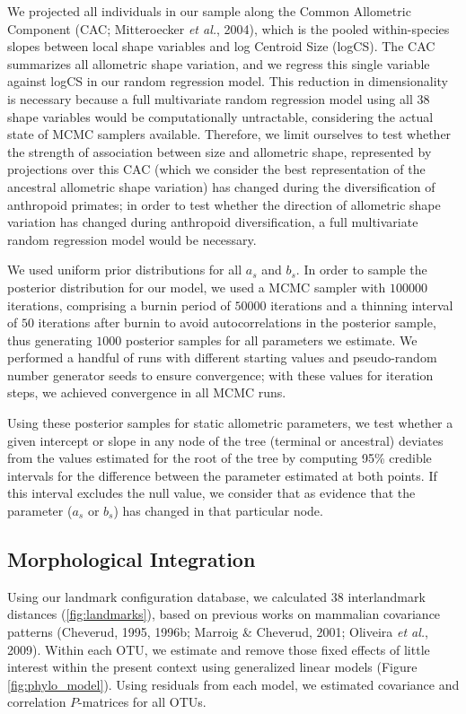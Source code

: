 \documentclass[12pt,]{article}
\begin{document}
We projected all individuals in our sample along the Common Allometric
Component (CAC; Mitteroecker \emph{et al.}, 2004), which is the pooled
within-species slopes between local shape variables and log Centroid
Size (logCS). The CAC summarizes all allometric shape variation, and we
regress this single variable against logCS in our random regression
model. This reduction in dimensionality is necessary because a full
multivariate random regression model using all 38 shape variables would
be computationally untractable, considering the actual state of MCMC
samplers available. Therefore, we limit ourselves to test whether the
strength of association between size and allometric shape, represented
by projections over this CAC (which we consider the best representation
of the ancestral allometric shape variation) has changed during the
diversification of anthropoid primates; in order to test whether the
direction of allometric shape variation has changed during anthropoid
diversification, a full multivariate random regression model would be
necessary.

We used uniform prior distributions for all $a_s$ and $b_s$. In order to
sample the posterior distribution for our model, we used a MCMC sampler
with $100000$ iterations, comprising a burnin period of $50000$
iterations and a thinning interval of $50$ iterations after burnin to
avoid autocorrelations in the posterior sample, thus generating $1000$
posterior samples for all parameters we estimate. We performed a handful
of runs with different starting values and pseudo-random number
generator seeds to ensure convergence; with these values for iteration
steps, we achieved convergence in all MCMC runs.

Using these posterior samples for static allometric parameters, we test
whether a given intercept or slope in any node of the tree (terminal or
ancestral) deviates from the values estimated for the root of the tree
by computing 95\% credible intervals for the difference between the
parameter estimated at both points. If this interval excludes the null
value, we consider that as evidence that the parameter ($a_s$ or $b_s$)
has changed in that particular node.

\subsection{Morphological Integration}\label{morphological-integration}

Using our landmark configuration database, we calculated 38
interlandmark distances (\autoref{fig:landmarks}), based on previous
works on mammalian covariance patterns (Cheverud, 1995, 1996b; Marroig
\& Cheverud, 2001; Oliveira \emph{et al.}, 2009). Within each OTU, we
estimate and remove those fixed effects of little interest within the
present context using generalized linear models (Figure
\ref{fig:phylo_model}). Using residuals from each model, we estimated
covariance and correlation $P$-matrices for all OTUs.
\end{document}
